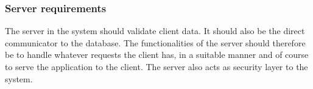 \subsubsection{Server requirements}

The server in the system should validate client data. It should also be the
direct communicator to the database. The functionalities of the server should 
therefore be to handle whatever requests the client has, in a suitable manner 
and of course to serve the application to the client. The server also acts as
security layer to the system.
